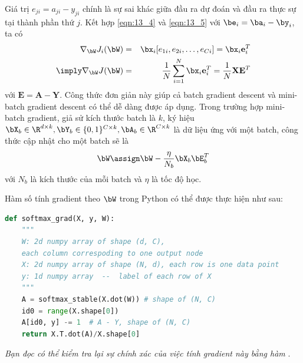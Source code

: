 Giá trị $e_{ji} = a_{ji} - y_{ji}$ chính là sự sai khác giữa đầu ra dự đoán và
đầu ra thực sự tại thành phần thứ $j$. Kết hợp \eqref{eqn:13_4} và
\eqref{eqn:13_5} với $\be_i = \ba_i - \by_i$, ta có
\begin{eqnarray}
\nabla_{\bW}J_i(\bW)
&=& \bx_i [e_{1i}, e_{2i}, \dots, e_{Ci}] = \bx_i\mathbf{e}_i^T \\
\imply \nabla_{\bW}J(\bW)
&=& \frac{1}{N}\sum_{i=1}^N
\bx_i\mathbf{e}_i^T = \frac{1}{N}\mathbf{X}\mathbf{E}^T
\end{eqnarray}
với $\mathbf{E} = \mathbf{A - Y}$. Công thức đơn giản này giúp cả batch gradient descent và mini-batch gradient descent có thể dễ dàng
được áp dụng. Trong trường hợp mini-batch gradient, giả sử kích thước batch là
$k$, ký hiệu $\bX_b \in \R^{d \times k}, \bY_b \in \{0, 1\}^{C \times k},
\bA_b \in \R^{C \times k}$ là dữ liệu ứng với một batch, công thức cập nhật cho
một batch sẽ là
\begin{equation}
\bW \assign \bW - \frac{\eta}{N_b}\bX_b\bE_b^T
\end{equation}
với $N_b$ là kích thước của mỗi batch và $\eta$ là tốc độ học.

Hàm số tính gradient theo $\bW$ trong Python có thể được thực hiện như sau:
\begin{lstlisting}[language=Python]
def softmax_grad(X, y, W):
    """
    W: 2d numpy array of shape (d, C),
    each column correspoding to one output node
    X: 2d numpy array of shape (N, d), each row is one data point
    y: 1d numpy array  --  label of each row of X
    """
    A = softmax_stable(X.dot(W)) # shape of (N, C)
    id0 = range(X.shape[0])
    A[id0, y] -= 1  # A - Y, shape of (N, C)
    return X.T.dot(A)/X.shape[0]
\end{lstlisting}
\textit{Bạn đọc có thể kiểm tra lại sự chính xác của việc tính gradient này bằng hàm }.

